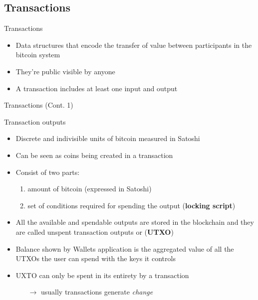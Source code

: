 \documentclass{beamer}
\begin{document}
  \subsection{Transactions}
  \begin{frame}{Transactions}
    \begin{itemize}
      \item Data structures that encode the transfer of value between participants
      in the bitcoin system \pause
      \item They're public visible by anyone \pause
      \item A transaction includes at least one input and output
    \end{itemize}
  \end{frame}





  \begin{frame}{Transactions (Cont. 1)}
    \begin{block}{Transaction outputs}
      \begin{itemize}
        \item Discrete and indivisible units of bitcoin measured in Satoshi \pause
        \item Can be seen as coins being created in a transaction \pause
        \item Consist of two parts:
        \begin{enumerate}
          \item amount of bitcoin (expressed in Satoshi)
          \item set of conditions required for spending the output (\textbf{locking script})\pause
        \end{enumerate}
        \item All the available and spendable outputs are stored in the blockchain
        and they are called unspent transaction outputs or (\textbf{UTXO}) \pause
        \item Balance shown by Wallets application is the aggregated value of
        all the UTXOs the user can spend with the keys it controls \pause
        \item UXTO can only be spent in its entirety by a transaction \pause
        \begin{itemize}
          \item[$\rightarrow$] usually transactions generate \emph{change}
        \end{itemize}
      \end{itemize}
    \end{block}
  \end{frame}
\end{document}
